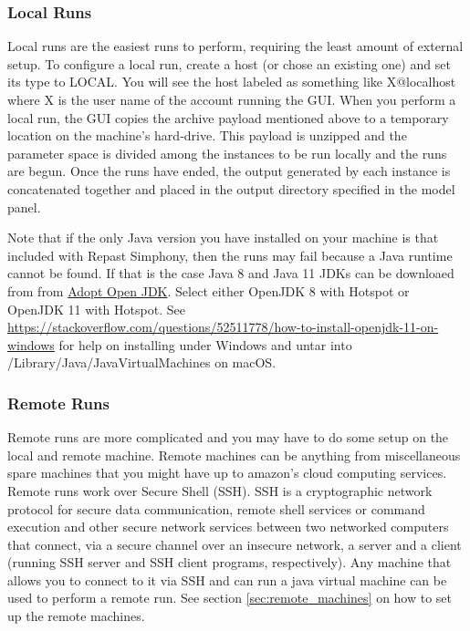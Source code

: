 \documentclass[11pt]{amsart}
\begin{document}
\subsubsection{Local Runs}
Local runs are the easiest runs to perform, requiring the least amount of external setup. To configure a local run, create a host (or chose an existing one) and set its type to LOCAL. You will see the host labeled as something like X@localhost where X is the user name of the account running the GUI. When you perform a local run, the GUI copies the archive payload mentioned above to a temporary location on the machine's hard-drive. This payload is unzipped and the parameter space is divided among the instances to be run locally and the runs are begun. Once the runs have ended, the output generated by each instance is concatenated together and placed in the output directory specified in the model panel.

Note that if the only Java version you have installed on your machine is that included with
Repast Simphony, then the runs may fail because a Java runtime cannot be found. If that is
the case Java 8 and Java 11 JDKs can be downloaed from from
 \href{https://adoptopenjdk.net}{Adopt Open JDK}. Select either
OpenJDK 8 with Hotspot or OpenJDK 11 with Hotspot. See \href{https://stackoverflow.com/questions/52511778/how-to-install-openjdk-11-on-windows}
{https://stackoverflow.com/questions/52511778/how-to-install-openjdk-11-on-windows} for
help on installing under Windows and untar into /Library/Java/JavaVirtualMachines on macOS.

\subsubsection{Remote Runs}
\label{sec:distributed_runs}
Remote runs are more complicated and you may have to do some setup on the local and remote machine. Remote machines can be anything from miscellaneous spare machines that you might have up to amazon's cloud computing services. Remote runs work over Secure Shell (SSH). SSH is a cryptographic network protocol for secure data communication, remote shell services or command execution and other secure network services between two networked computers that connect, via a secure channel over an insecure network, a server and a client (running SSH server and SSH client programs, respectively). Any machine that allows you to connect to it via SSH and can run a java virtual machine can be used to perform a remote run. See section \ref{sec:remote_machines} on how to set up the remote machines.
\end{document}
